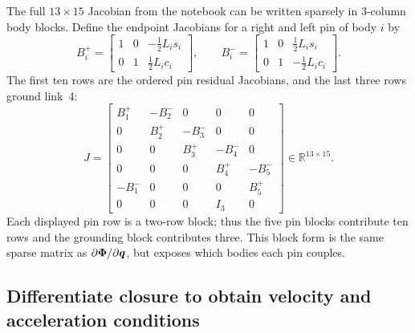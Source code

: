 \documentclass[../main.tex]{subfiles}
\begin{document}
	The full $13\times15$ Jacobian from the notebook can be written sparsely in $3$-column body blocks. Define the endpoint Jacobians for a right and left pin of body $i$ by
	\begin{equation}
	B_i^+=\begin{bmatrix}1&0&-\frac12L_i s_i\\0&1&\frac12L_i c_i\end{bmatrix},
	\qquad
	B_i^-=\begin{bmatrix}1&0&\frac12L_i s_i\\0&1&-\frac12L_i c_i\end{bmatrix}.
	\label{eq:five-link-endpoint-jacobians-ch4}
	\end{equation}
	The first ten rows are the ordered pin residual Jacobians, and the last three rows ground link~4:
	\begin{equation}
	J=\begin{bmatrix}
	B_1^+&-B_2^-&0&0&0\\
	0&B_2^+&-B_3^-&0&0\\
	0&0&B_3^+&-B_4^-&0\\
	0&0&0&B_4^+&-B_5^-\\
	-B_1^-&0&0&0&B_5^+\\
	0&0&0&I_3&0
	\end{bmatrix}\in\mathbb R^{13\times15}.
	\label{eq:five-link-expanded-jacobian-ch4}
	\end{equation}
	Each displayed pin row is a two-row block; thus the five pin blocks contribute ten rows and the grounding block contributes three. This block form is the same sparse matrix as $\partial\boldsymbol{\Phi}/\partial\boldsymbol{q}$, but exposes which bodies each pin couples.

	\subsection{Differentiate closure to obtain velocity and acceleration conditions}
\end{document}
